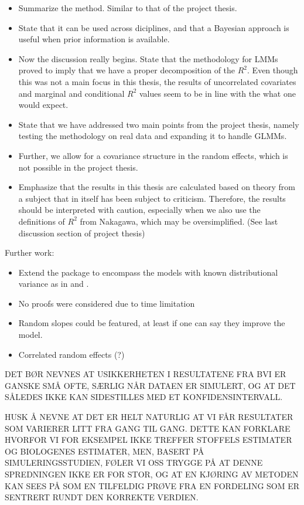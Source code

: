 \begin{itemize}
    \item Summarize the method. Similar to that of the project thesis. 
    \item State that it can be used across diciplines, and that a Bayesian approach is useful when prior information is available.
    \item Now the discussion really begins. State that the methodology for LMMs proved to imply that we have a proper decomposition of the $R^2$. Even though this was not a main focus in this thesis, the results of uncorrelated covariates and marginal and conditional $R^2$ values seem to be in line with the what one would expect. 
    \item State that we have addressed two main points from the project thesis, namely testing the methodology on real data and expanding it to handle GLMMs.
    \item Further, we allow for a covariance structure in the random effects, which is not possible in the project thesis.
    \item Emphasize that the results in this thesis are calculated based on theory from a subject that in itself has been subject to criticism. Therefore, the results should be interpreted with caution, especially when we also use the definitions of $R^2$ from Nakagawa, which may be oversimplified. (See last discussion section of project thesis)
\end{itemize}

Further work:
\begin{itemize}
    \item Extend the package to encompass the models with known distributional variance as in \citet{nakagawa2013general} and \citet{nakagawa2017}.
    \item No proofs were considered due to time limitation
    \item Random slopes could be featured, at least if one can say they improve the model.
    \item Correlated random effects (?)
\end{itemize}

DET BØR NEVNES AT USIKKERHETEN I RESULTATENE FRA BVI ER GANSKE SMÅ OFTE, SÆRLIG NÅR DATAEN ER SIMULERT, OG AT DET SÅLEDES IKKE KAN SIDESTILLES MED ET KONFIDENSINTERVALL.


HUSK Å NEVNE AT DET ER HELT NATURLIG AT VI FÅR RESULTATER SOM VARIERER LITT FRA GANG TIL GANG. DETTE KAN FORKLARE HVORFOR VI FOR EKSEMPEL IKKE TREFFER STOFFELS ESTIMATER OG BIOLOGENES ESTIMATER, MEN, BASERT PÅ SIMULERINGSSTUDIEN, FØLER VI OSS TRYGGE PÅ AT DENNE SPREDNINGEN IKKE ER FOR STOR, OG AT EN KJØRING AV METODEN KAN SEES PÅ SOM EN TILFELDIG PRØVE FRA EN FORDELING SOM ER SENTRERT RUNDT DEN KORREKTE VERDIEN.

